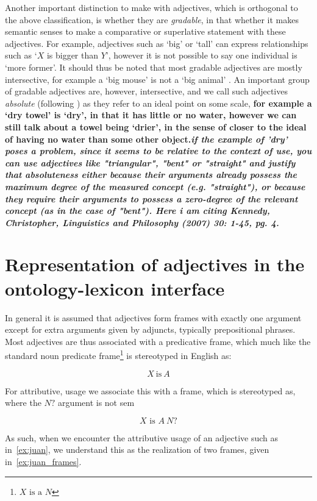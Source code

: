 \documentclass[11pt]{article}
\begin{document}
Another important distinction to make with adjectives, which is orthogonal to the above classification, 
is whether they are \emph{gradable}, in that whether it makes semantic senses to make a comparative 
or superlative statement with these adjectives. For example, adjectives such as 
`big' or `tall' can express relationships such as `$X$ is bigger than $Y$', 
however it is not possible to say one individual is `more former'. It should thus be noted that most gradable adjectives are mostly intersective,
for example a `big mouse' is not a `big animal' \cite{morzycki2013modification}.
An important group of gradable adjectives are, however, intersective, and we call 
such adjectives \emph{absolute} (following \cite{rusiecki1985adjectives}) as they 
refer to an ideal point on some scale, \textbf{for example a `dry towel' is `dry', in 
that it has little or no water, however we can still talk about a towel being 
`drier', in the sense of closer to the ideal of having no water than some other 
object.\textit{if the example of 'dry' poses a problem, since it seems to  be relative to the context of use, you can use adjectives like "triangular", "bent" or "straight" and justify that absoluteness either because their arguments already possess the maximum degree of the measured concept (e.g. "straight"), or because they require their arguments to possess a zero-degree of the relevant concept (as in the case of "bent"). Here i am citing Kennedy, Christopher, Linguistics and Philosophy (2007) 30: 1-45, pg. 4.}}


\section{Representation of adjectives in the ontology-lexicon interface}

In general it is assumed that adjectives form frames with exactly one argument 
except for extra arguments given by adjuncts, typically prepositional phrases. 
Most adjectives are thus associated with a predicative frame, which much
like the standard noun predicate frame\footnote{$X\text{ is a }N$} is stereotyped in English as:

$$X\mathrm{~is~}A$$

For attributive, usage we associate this with a frame, which is stereotyped as,
where the $N?$ argument is not sem

$$X\text{ is }A~N?$$

As such, when we encounter the attributive usage of an adjective such as in~\ref{ex:juan}, 
we understand this as the realization of two frames, given in~\ref{ex:juan_frames}.
\end{document}
